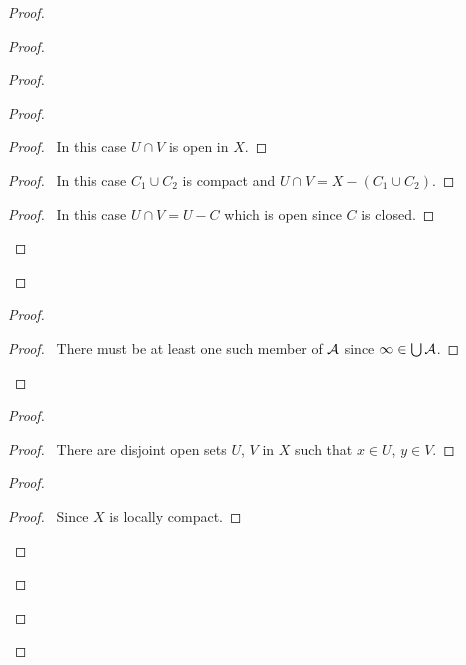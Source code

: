 \begin{proof}
\begin{proof}
\begin{proof}
\begin{proof}
\begin{proof}
                    \pf\ In this case $U \cap V$ is open in $X$.
                \end{proof}
                \begin{proof}
                    \pf\ In this case $C_1 \cup C_2$ is compact and $U \cap V = X - (C_1 \cup C_2)$.
                \end{proof}
                \begin{proof}
                    \pf\ In this case $U \cap V = U - C$ which is open since $C$ is closed.
                \end{proof}
            \end{proof}
        \end{proof}
        \begin{proof}
            \begin{proof}
                \pf\ There must be at least one such member of $\AA$ since $\infty \in \bigcup \AA$.
            \end{proof}
        \end{proof}
        \begin{proof}
            \begin{proof}
                \pf\ There are disjoint open sets $U$, $V$ in $X$ such that $x \in U$, $y \in V$.
            \end{proof}
            \begin{proof}
                \begin{proof}
                    \pf\ Since $X$ is locally compact.
                \end{proof}

\end{proof}
\end{proof}
\end{proof}
\end{proof}
